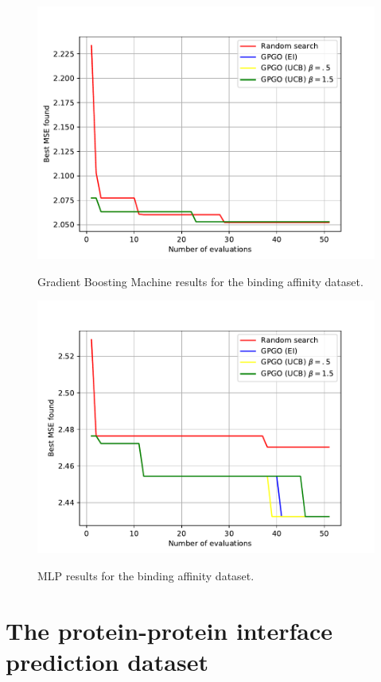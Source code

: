 \documentclass[10pt,a4paper,twoside]{book}
\begin{document}
\begin{figure}
\centering
\caption{Gradient Boosting Machine results for the binding affinity dataset.}
\includegraphics[scale=0.75]{figures/chapter4/aff/gbm}
\label{fig:affgbm}
\end{figure}

\begin{figure}
\centering
\caption{MLP results for the binding affinity dataset.}
\includegraphics[scale=0.75]{figures/chapter4/aff/mlp}
\label{fig:affmlp}
\end{figure}

\newpage

\section{The protein-protein interface prediction dataset}
\end{document}
